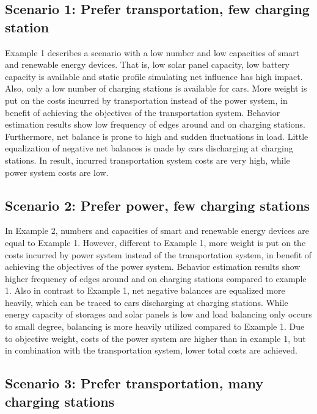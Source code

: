 \subsection*{Scenario 1: Prefer transportation, few charging station}
Example 1 describes a scenario with a low number and low capacities of smart and renewable energy devices. That is, low solar panel capacity, low battery capacity is available and static profile simulating net influence has high impact. Also, only a low number of charging stations is available for cars. More weight is put on the costs incurred by transportation instead of the power system, in benefit of achieving the objectives of the transportation system. Behavior estimation results show low frequency of edges around and on charging stations. Furthermore, net balance is prone to high and sudden fluctuations in load. Little equalization of negative net balances is made by cars discharging at charging stations. In result, incurred transportation system costs are very high, while power system costs are low.

\subsection*{Scenario 2: Prefer power, few charging stations}

In Example 2, numbers and capacities of smart and renewable energy devices are equal to Example 1. However, different to Example 1, more weight is put on the costs incurred by power system instead of the transportation system, in benefit of achieving the objectives of the power system. Behavior estimation results show higher frequency of edges around and on charging stations compared to example 1. Also in contrast to Example 1, net negative balances are equalized more heavily, which can be traced to cars discharging at charging stations. While energy capacity of storages and solar panels is low and load balancing only occurs to small degree, balancing is more heavily utilized compared to Example 1. Due to objective weight, costs of the power system are higher than in example 1, but in combination with the transportation system, lower total costs are achieved.

\subsection*{Scenario 3: Prefer transportation, many charging stations}

